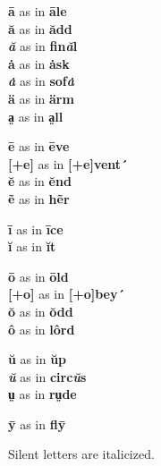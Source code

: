 \begin{multicols}{3}
\noindent\textbf{ā} as in \textbf{āle}\\
\textbf{ă} as in \textbf{ădd}\\
\textbf{\emph{ă}} as in \textbf{fin\emph{ă}l}\\
\textbf{ȧ} as in \textbf{ȧsk}\\
\textbf{\emph{ȧ}} as in \textbf{sof\emph{ȧ}}\\
\textbf{ä} as in \textbf{ärm}\\
\textbf{a̤} as in \textbf{a̤ll}

\noindent\textbf{ē} as in \textbf{ēve}\\
\textbf{{[}+e{]}} as in \textbf{{[}+e{]}vent´}\\
\textbf{ĕ} as in \textbf{ĕnd}\\
\textbf{ẽ} as in \textbf{hẽr}

\noindent\textbf{ī} as in \textbf{īce}\\
\textbf{ĭ} as in \textbf{ĭt}

\noindent\textbf{ō} as in \textbf{ōld}\\
\textbf{{[}+o{]}} as in \textbf{{[}+o{]}bey´}\\
\textbf{ŏ} as in \textbf{ŏdd}\\
\textbf{ô} as in \textbf{lôrd}

\noindent\textbf{ŭ} as in \textbf{ŭp}\\
\textbf{\emph{ŭ}} as in \textbf{circ\emph{ŭ}s}\\
\textbf{ṳ} as in \textbf{rṳde}

\noindent\textbf{ȳ} as in \textbf{flȳ}
\end{multicols}

\noindent Silent letters are italicized.
